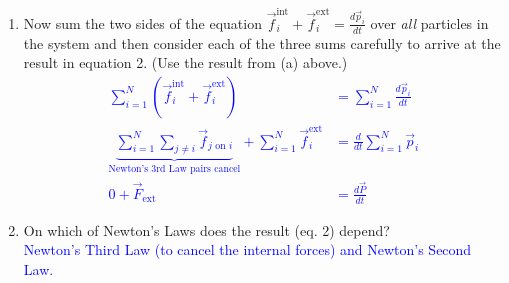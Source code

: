 \documentclass[11pt, letterpaper, openany]{book}
\begin{document}
\begin{enumerate}[label=(\alph*), resume]
    \item Now sum the two sides of the equation $\vec{f}_i^{\text{int}} + \vec{f}_i^{\text{ext}} = \frac{d\vec{p}_i}{dt}$ over \textit{all} particles in the system and then consider each of the three sums carefully to arrive at the result in equation 2. (Use the result from (a) above.) \\
    \textcolor{blue}{
    \begin{align*}
        \sum_{i=1}^N \left( \vec{f}_i^{\text{int}} + \vec{f}_i^{\text{ext}} \right) &= \sum_{i=1}^N \frac{d\vec{p}_i}{dt} \\
        \underbrace{\sum_{i=1}^N \sum_{j \neq i} \vec{f}_{j\text{ on }i}}_{\text{Newton's 3rd Law pairs cancel}} + \sum_{i=1}^N \vec{f}_i^{\text{ext}} &= \frac{d}{dt} \sum_{i=1}^N \vec{p}_i \\
        0 + \vec{F}_{\text{ext}} &= \frac{d\vec{P}}{dt}
    \end{align*}
    }
    
    \item On which of Newton's Laws does the result (eq. 2) depend? \\
    \textcolor{blue}{Newton's Third Law (to cancel the internal forces) and Newton's Second Law.}
\end{enumerate}
\end{document}

